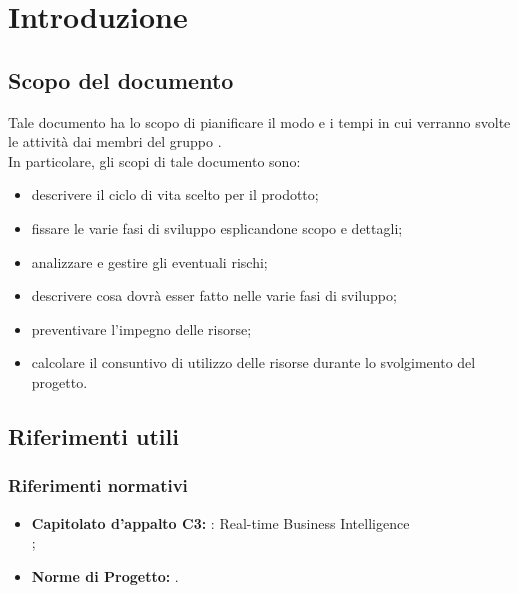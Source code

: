 \section{Introduzione}

	\subsection{Scopo del documento}
		Tale documento ha lo scopo di pianificare il modo e i tempi in cui verranno svolte le attività dai membri del gruppo \groupname{}.\\
		In particolare, gli scopi di tale documento sono:
		\begin{itemize}
			\item descrivere il ciclo di vita scelto per il prodotto;
			\item fissare le varie fasi di sviluppo esplicandone scopo e dettagli;
			\item analizzare e gestire gli eventuali rischi;
			\item descrivere cosa dovrà esser fatto nelle varie fasi di sviluppo;
			\item preventivare l'impegno delle risorse;
			\item calcolare il consuntivo di utilizzo delle risorse durante lo svolgimento del progetto.
		\end{itemize}
	
		

	\subsection{Riferimenti utili}
		\subsubsection{Riferimenti normativi}
			\begin{itemize}
				\item \textbf{Capitolato d'appalto C3:} \projectname{}: Real-time Business Intelligence \\
					;
				\item \textbf{Norme di Progetto:} .
			\end{itemize}
